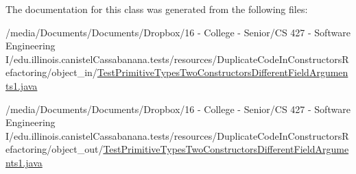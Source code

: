 The documentation for this class was generated from the following files:\begin{DoxyCompactItemize}
\item 
/media/Documents/Documents/Dropbox/16 -\/ College -\/ Senior/CS 427 -\/ Software Engineering I/edu.illinois.canistelCassabanana.tests/resources/DuplicateCodeInConstructorsRefactoring/object\_\-in/\hyperlink{object__in_2TestPrimitiveTypesTwoConstructorsDifferentFieldArguments1_8java}{TestPrimitiveTypesTwoConstructorsDifferentFieldArguments1.java}\item 
/media/Documents/Documents/Dropbox/16 -\/ College -\/ Senior/CS 427 -\/ Software Engineering I/edu.illinois.canistelCassabanana.tests/resources/DuplicateCodeInConstructorsRefactoring/object\_\-out/\hyperlink{object__out_2TestPrimitiveTypesTwoConstructorsDifferentFieldArguments1_8java}{TestPrimitiveTypesTwoConstructorsDifferentFieldArguments1.java}\end{DoxyCompactItemize}
